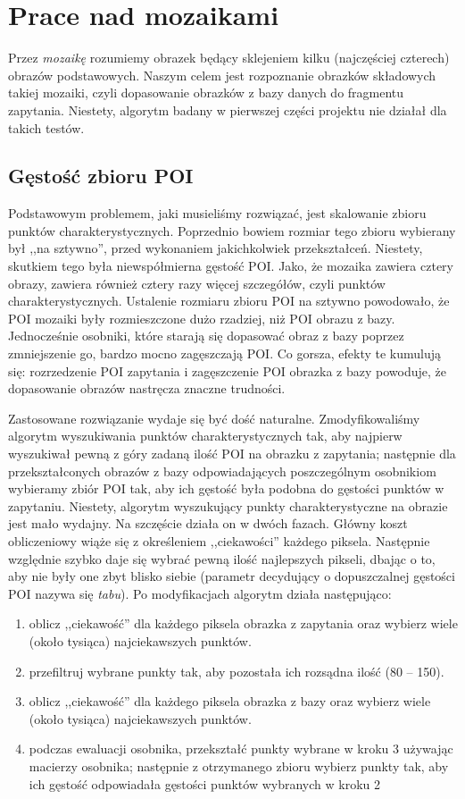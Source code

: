 \documentclass[a4paper,12pt,leqno]{article}
\begin{document}
\section{Prace nad mozaikami}

Przez \textit{mozaikę} rozumiemy obrazek będący sklejeniem kilku (najczęściej czterech) obrazów podstawowych.
Naszym celem jest rozpoznanie obrazków składowych takiej mozaiki, czyli dopasowanie obrazków z bazy danych do fragmentu zapytania.
Niestety, algorytm badany w pierwszej części projektu nie działał dla takich testów.

\subsection{Gęstość zbioru POI}
Podstawowym problemem, jaki musieliśmy rozwiązać, jest skalowanie zbioru punktów charakterystycznych. 
Poprzednio bowiem rozmiar tego zbioru wybierany był ,,na sztywno'', przed wykonaniem jakichkolwiek przekształceń. Niestety, skutkiem tego była niewspółmierna gęstość POI. Jako, że mozaika
zawiera cztery obrazy, zawiera również cztery razy więcej szczegółów, czyli punktów charakterystycznych. Ustalenie rozmiaru zbioru POI na sztywno powodowało, że POI mozaiki
były rozmieszczone dużo rzadziej, niż POI obrazu z bazy. Jednocześnie osobniki, które starają się dopasować obraz z bazy poprzez zmniejszenie go, bardzo mocno zagęszczają POI.
Co gorsza, efekty te kumulują się: rozrzedzenie POI zapytania i zagęszczenie POI obrazka z bazy powoduje, że dopasowanie obrazów nastręcza znaczne trudności.

Zastosowane rozwiązanie wydaje się być dość naturalne. Zmodyfikowaliśmy algorytm wyszukiwania punktów charakterystycznych tak, aby najpierw wyszukiwał pewną z góry zadaną ilość POI na 
obrazku z zapytania; następnie dla przekształconych obrazów z bazy odpowiadających poszczególnym osobnikiom wybieramy zbiór POI tak, aby ich gęstość była podobna do gęstości punktów w 
zapytaniu. Niestety, algorytm wyszukujący punkty charakterystyczne na obrazie jest mało wydajny. Na szczęście działa on w dwóch fazach. Główny koszt obliczeniowy wiąże się z 
określeniem ,,ciekawości'' każdego piksela. Następnie względnie szybko daje się wybrać pewną ilość najlepszych pikseli, dbając o to, aby nie były one zbyt blisko siebie (parametr decydujący o
dopuszczalnej gęstości POI nazywa się \textit{tabu}). Po modyfikacjach algorytm działa następująco:
\begin{enumerate}
 \item oblicz ,,ciekawość'' dla każdego piksela obrazka z zapytania oraz wybierz wiele (około tysiąca) najciekawszych punktów.
 \item przefiltruj wybrane punkty tak, aby pozostała ich rozsądna ilość (80 -- 150).
 \item oblicz ,,ciekawość'' dla każdego piksela obrazka z bazy oraz wybierz wiele (około tysiąca) najciekawszych punktów.
 \item podczas ewaluacji osobnika, przekształć punkty wybrane w kroku 3 używając macierzy osobnika;
       następnie z otrzymanego zbioru wybierz punkty tak, aby ich gęstość odpowiadała gęstości punktów wybranych w kroku 2
\end{enumerate}
\end{document}
